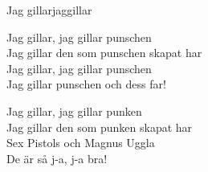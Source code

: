\begin{song}{Jag gillar}{jaggillar}
\begin{vers}
Jag gillar, jag gillar punschen\\
Jag gillar den som punschen skapat har\\
Jag gillar, jag gillar punschen\\
Jag gillar punschen och dess far!\\
\end{vers}
\begin{vers}
Jag gillar, jag gillar punken\\
Jag gillar den som punken skapat har\\
Sex Pistols och Magnus Uggla\\
De är så j-a, j-a bra!
\end{vers}
\end{song}

